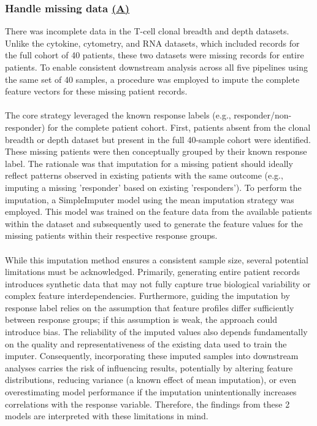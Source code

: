 \documentclass[12pt,a4paper]{report}
\begin{document}
\subsubsection*{Handle missing data \hyperref[fig:pipeline-1]{(A)}}
There was incomplete data in the T-cell clonal breadth and depth datasets. Unlike the cytokine, cytometry, and RNA datasets, which included records for the full cohort of 40 patients, these two datasets were missing records for entire patients. To enable consistent downstream analysis across all five pipelines using the same set of 40 samples, a procedure was employed to impute the complete feature vectors for these missing patient records.\\
\\
The core strategy leveraged the known response labels (e.g., responder/non-responder) for the complete patient cohort. First, patients absent from the clonal breadth or depth dataset but present in the full 40-sample cohort were identified. These missing patients were then conceptually grouped by their known response label. The rationale was that imputation for a missing patient should ideally reflect patterns observed in existing patients with the same outcome (e.g., imputing a missing 'responder' based on existing 'responders'). To perform the imputation, a SimpleImputer model using the mean imputation strategy was employed. This model was trained on the feature data from the available patients within the dataset and subsequently used to generate the feature values for the missing patients within their respective response groups.\\
\\
While this imputation method ensures a consistent sample size, several potential limitations must be acknowledged. Primarily, generating entire patient records introduces synthetic data that may not fully capture true biological variability or complex feature interdependencies. Furthermore, guiding the imputation by response label relies on the assumption that feature profiles differ sufficiently between response groups; if this assumption is weak, the approach could introduce bias. The reliability of the imputed values also depends fundamentally on the quality and representativeness of the existing data used to train the imputer. Consequently, incorporating these imputed samples into downstream analyses carries the risk of influencing results, potentially by altering feature distributions, reducing variance (a known effect of mean imputation), or even overestimating model performance if the imputation unintentionally increases correlations with the response variable. Therefore, the findings from these 2 models are interpreted with these limitations in mind.
\end{document}
